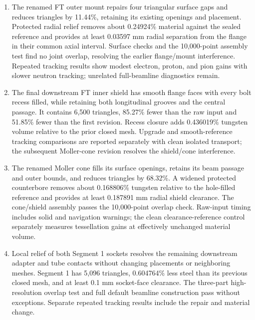\begin{enumerate}
The separate control at fixed material volume gives median tracking speedups of 1.073, 1.016, 1.034, and
1.013 for electrons, protons, positive pions, and neutrons, with the simplified mesh faster in every seed
pair of this larger sample.

\item The renamed FT outer mount repairs four triangular surface gaps and reduces triangles by 11.44\%,
retaining
its existing openings and placement. Protected radial relief removes about 0.24924\% material against the
sealed reference and provides at least 0.03597 mm radial separation from the flange in their common axial
interval. Surface checks and the 10,000-point assembly test find no joint overlap, resolving the earlier
flange/mount interference. Repeated tracking results show modest electron, proton, and pion gains with
slower neutron tracking; unrelated full-beamline diagnostics remain.

\item The final downstream FT inner shield has smooth flange faces with every bolt recess filled, while
retaining
both longitudinal grooves and the central passage. It contains 6,500 triangles, 85.27\% fewer than the raw
input and 51.85\% fewer than the first revision. Recess closure adds 0.436019\% tungsten volume relative to
the prior closed mesh. Upgrade and smooth-reference tracking comparisons are reported separately with clean
isolated transport; the subsequent Moller-cone revision resolves the shield/cone interference.

\item The renamed Moller cone fills its surface openings, retains its beam passage and outer bounds, and
reduces
triangles by 68.32\%. A widened protected counterbore removes about 0.168806\% tungsten relative to the
hole-filled reference and provides at least 0.187891 mm radial shield clearance. The cone/shield assembly
passes the 10,000-point overlap check. Raw-input timing includes solid and navigation warnings; the clean
clearance-reference control separately measures tessellation gains at effectively unchanged material volume.

\item Local relief of both Segment 1 sockets resolves the remaining downstream adapter and tube contacts
without
changing placements or neighboring meshes. Segment 1 has 5,096 triangles, 0.604764\% less steel than its
previous closed mesh, and at least 0.1 mm socket-face clearance. The three-part high-resolution overlap test
and full default beamline construction pass without exceptions. Separate repeated tracking results include
the repair and material change.


\end{enumerate}
